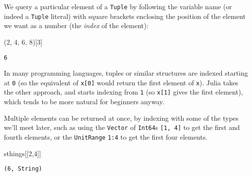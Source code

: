 \documentclass[
  letterpaper,
  DIV=11,
  numbers=noendperiod]{scrreprt}
\newenvironment{Shaded}{\begin{snugshade}}{\end{snugshade}}
\newcommand{\FloatTok}[1]{\textcolor[rgb]{0.68,0.00,0.00}{#1}}
\newcommand{\NormalTok}[1]{\textcolor[rgb]{0.00,0.23,0.31}{#1}}
\begin{document}
We query a particular element of a \texttt{Tuple} by following the
variable name (or indeed a \texttt{Tuple} literal) with square brackets
enclosing the position of the element we want as a number (the
\emph{index} of the element):

\begin{Shaded}
\begin{Highlighting}[]
\NormalTok{(}\FloatTok{2}\NormalTok{, }\FloatTok{4}\NormalTok{, }\FloatTok{6}\NormalTok{, }\FloatTok{8}\NormalTok{)[}\FloatTok{3}\NormalTok{]}
\end{Highlighting}
\end{Shaded}

\begin{verbatim}
6
\end{verbatim}

\begin{tcolorbox}[enhanced jigsaw, toprule=.15mm, opacitybacktitle=0.6, leftrule=.75mm, breakable, coltitle=black, bottomrule=.15mm, colbacktitle=quarto-callout-caution-color!10!white, bottomtitle=1mm, rightrule=.15mm, title=\textcolor{quarto-callout-caution-color}{\faFire}\hspace{0.5em}{Caution}, colframe=quarto-callout-caution-color-frame, left=2mm, colback=white, opacityback=0, arc=.35mm, toptitle=1mm, titlerule=0mm]

In many programming languages, tuples or similar structures are indexed
starting at \texttt{0} (so the equivalent of \texttt{x{[}0{]}} would
return the first element of \texttt{x}). Julia takes the other approach,
and starts indexing from \texttt{1} (so \texttt{x{[}1{]}} gives the
first element), which tends to be more natural for beginners anyway.

\end{tcolorbox}

Multiple elements can be returned at once, by indexing with some of the
types we'll meet later, such as using the \texttt{Vector} of
\texttt{Int64}s \texttt{{[}1,\ 4{]}} to get the first and fourth
elements, or the \texttt{UnitRange} \texttt{1:4} to get the first four
elements.

\begin{Shaded}
\begin{Highlighting}[]
\NormalTok{sthings[[}\FloatTok{2}\NormalTok{,}\FloatTok{4}\NormalTok{]]}
\end{Highlighting}
\end{Shaded}

\begin{verbatim}
(6, String)
\end{verbatim}
\end{document}
